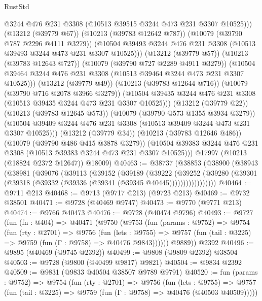 \begin{lexlean}{RustStd}
\begin{coremodule}
                    @3244
                    @476
                    @231
                    @3308
                    (@10513 @39515 @3244 @473 @231 @3307 @10525)))
                (@13212 (@39779 @67))
                (@10213 (@39783 @12642 @787))
                (@10079 (@39790 @787 @2296 @4111 @3279))
                (@10504 @39493 @3244 @476 @231 @3308 (@10513 @39493 @3244 @473 @231 @3307 @10525)))
              (@13212 (@39779 @57))
              (@10213 (@39783 @12643 @727))
              (@10079 (@39790 @727 @2289 @4911 @3279))
              (@10504 @39464 @3244 @476 @231 @3308 (@10513 @39464 @3244 @473 @231 @3307 @10525)))
            (@13212 (@39779 @49))
            (@10213 (@39783 @12644 @716))
            (@10079 (@39790 @716 @2078 @3966 @3279))
            (@10504 @39435 @3244 @476 @231 @3308 (@10513 @39435 @3244 @473 @231 @3307 @10525)))
          (@13212 (@39779 @22))
          (@10213 (@39783 @12645 @573))
          (@10079 (@39790 @573 @1355 @3934 @3279))
          (@10504 @39409 @3244 @476 @231 @3308 (@10513 @39409 @3244 @473 @231 @3307 @10525)))
        (@13212 (@39779 @34))
        (@10213 (@39783 @12646 @486))
        (@10079 (@39790 @486 @415 @3878 @3279))
        (@10504 @39383 @3244 @476 @231 @3308 (@10513 @39383 @3244 @473 @231 @3307 @10525)))
      @17997
      (@10213 (@18824 @2372 @12647))
      @18009)
@40463 := @38737
    (@38853
      (@38900
        (@38943
          (@38981
            (@39076
              (@39113
                (@39152
                  (@39189
                    (@39222
                      (@39252
                        (@39280
                          (@39301 (@39318 (@39332 (@39336 (@39341 (@39345 @40445)))))))))))))))))
@40464 := @9711 @213
@40468 := @9713 (@9717 @213) (@9723 @213)
@40469 := @9732 @38501
@40471 := @9728 (@40469 @9747)
@40473 := @9770 (@9771 @213)
@40474 := @9766 @40473
@40476 := @9728 (@40474 @9796)
@40493 := @9727
    (fun (fn : @404) =>
    @40471
      (@9750
        (@9753
          (fun (params : @9752) =>
          @9754
            (fun (rty : @2701) =>
            @9756
              (fun (lets : @9755) =>
              @9757 (fun (tail : @3225) => @9759 (fun (Γ : @9758) => @40476 @9843))))))
        @9889))
    @2392
@40496 := @9895 (@40469 (@9745 @2392))
@40499 := @9808 (@9809 @2392) @38504
@40503 := @9728 (@9800 (@40499 @9817) @9821)
@40504 := @9834 @2392
@40509 := @9831 (@9833 @40504 @38507 @9789 @9791)
@40520 := fun (params : @9752) =>
  @9754
    (fun (rty : @2701) =>
    @9756
      (fun (lets : @9755) =>
      @9757 (fun (tail : @3225) => @9759 (fun (Γ : @9758) => @40476 (@40503 @40509)))))

\end{coremodule}
\end{lexlean}
